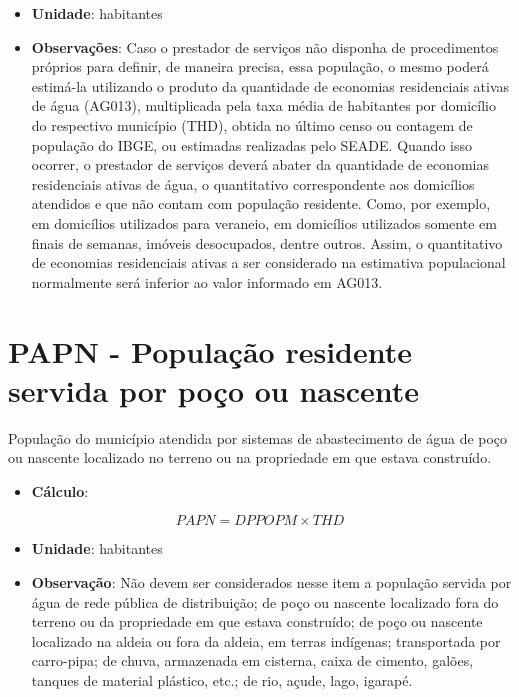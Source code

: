\documentclass[]{book}
\providecommand{\tightlist}{%
  \setlength{\itemsep}{0pt}\setlength{\parskip}{0pt}}
\begin{document}
\begin{itemize}
\item
  \textbf{Unidade}: habitantes
\item
  \textbf{Observações}: Caso o prestador de serviços não disponha de procedimentos próprios para definir, de maneira precisa, essa população, o mesmo poderá estimá-la utilizando o produto da quantidade de economias residenciais ativas de água (AG013), multiplicada pela taxa média de habitantes por domicílio do respectivo município (THD), obtida no último censo ou contagem de população do IBGE, ou estimadas realizadas pelo SEADE. Quando isso ocorrer, o prestador de serviços deverá abater da quantidade de economias residenciais ativas de água, o quantitativo correspondente aos domicílios atendidos e que não contam com população residente. Como, por exemplo, em domicílios utilizados para veraneio, em domicílios utilizados somente em finais de semanas, imóveis desocupados, dentre outros. Assim, o quantitativo de economias residenciais ativas a ser considerado na estimativa populacional normalmente será inferior ao valor informado em AG013.
\end{itemize}

\hypertarget{papn---populauxe7uxe3o-residente-servida-por-pouxe7o-ou-nascente}{%
\section*{PAPN - População residente servida por poço ou nascente}\label{papn---populauxe7uxe3o-residente-servida-por-pouxe7o-ou-nascente}}

População do município atendida por sistemas de abastecimento de água de poço ou nascente localizado no terreno ou na propriedade em que estava construído.

\begin{itemize}
\tightlist
\item
  \textbf{Cálculo}:
\end{itemize}

\[
PAPN = DPPOPM \times THD
\]

\begin{itemize}
\item
  \textbf{Unidade}: habitantes
\item
  \textbf{Observação}: Não devem ser considerados nesse item a população servida por água de rede pública de distribuição; de poço ou nascente localizado fora do terreno ou da propriedade em que estava construído; de poço ou nascente localizado na aldeia ou fora da aldeia, em terras indígenas; transportada por carro-pipa; de chuva, armazenada em cisterna, caixa de cimento, galões, tanques de material plástico, etc.; de rio, açude, lago, igarapé.
\end{itemize}
\end{document}

